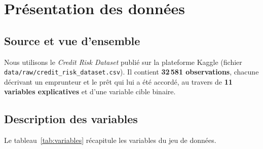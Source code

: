 
\section{Présentation des données}
\label{sec:donnees}

\subsection{Source et vue d'ensemble}

Nous utilisons le \emph{Credit Risk Dataset} publié sur la plateforme Kaggle
\cite{kaggle_credit_risk} (fichier \texttt{data/raw/credit\_risk\_dataset.csv}).
Il contient \textbf{32\,581 observations}, chacune décrivant un emprunteur et le
prêt qui lui a été accordé, au travers de \textbf{11 variables explicatives} et
d'une variable cible binaire.

\subsection{Description des variables}

Le tableau~\ref{tab:variables} récapitule les variables du jeu de données.

